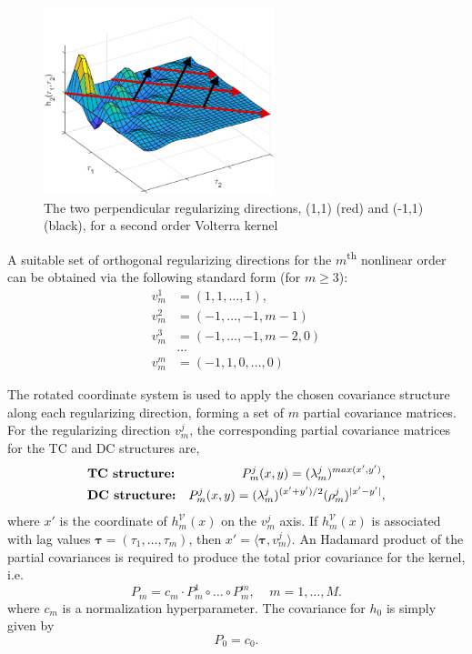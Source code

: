 \begin{figure}[h]
\centering
\includegraphics[width = 0.6\textwidth]{Chapter3_VolterraSeries/RegDirections3.pdf}
\caption{The two perpendicular regularizing directions, (1,1) (red) and (-1,1) (black), for a second order Volterra kernel}
\label{fig:SecondOrderRegDir}
\end{figure}

\begin{rem}
A suitable set of orthogonal regularizing directions for the $m$\textsuperscript{th} nonlinear order can be obtained via the following standard form (for $m \geq 3$):
\begin{equation}
\begin{split}
v_m^1 &= (1,1,\hdots,1), \\
v_m^2 &= (-1,\hdots,-1,m-1) \\
v_m^3 &= (-1,\hdots,-1,m-2,0) \\
&\hdots \\
v_m^m &= (-1,1,0,\hdots,0)
\end{split}
\end{equation}
\end{rem}

The rotated coordinate system is used to apply the chosen covariance structure along each regularizing direction, forming a set of $m$ partial covariance matrices. For the regularizing direction $v_m^j$, the corresponding partial covariance matrices for the TC and DC structures are,
\begin{align}
\label{TCext}
&\textbf{TC structure:} \hfill &P_m^j(x,y) = (\lambda_m^j)^{max(x',y')}, \\
&\textbf{DC structure:} \hfill &P_m^j(x,y) = (\lambda_m^j)^{(x' + y')/2} (\rho_m^j)^{|x'-y'|},
\label{DCext}
\end{align}
where $x'$ is the coordinate of $h^{\mathcal{V}}_{m}(x)$ on the $v_m^j$ axis. If $h^{\mathcal{V}}_{m}(x)$ is associated with lag values $\bm{\tau} = (\tau_1, \hdots, \tau_m)$, then $x' = \langle \bm{\tau} , v_m^j \rangle$. An Hadamard product of the partial covariances is required to produce the total prior covariance for the kernel, i.e.
\begin{equation}
\label{FinalPenalty}
P_m = c_m \cdot P_m^1 \circ \hdots \circ P_m^m, \; \; \; \; m = 1, \hdots, M.
\end{equation}
where $c_m$ is a normalization hyperparameter. The covariance for $h_0$ is simply given by 
\begin{equation}
P_0 = c_0.
\end{equation}

